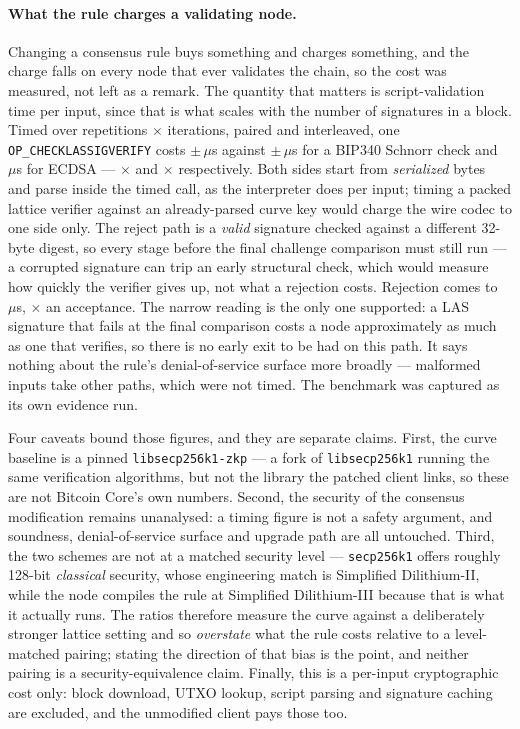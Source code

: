 \paragraph{What the rule charges a validating node.}
Changing a consensus rule buys something and charges something, and the charge falls on every
node that ever validates the chain, so the cost was measured, not left as a remark.
The quantity that matters is script-validation time per input, since that is what scales with
the number of signatures in a block. Timed over \btcLasBenchReps{} repetitions $\times$
\btcLasBenchIters{} iterations, paired and interleaved, one \texttt{OP\_CHECKLASSIGVERIFY}
costs \btcLasVerifyUs$\pm$\btcLasVerifySd\,$\mu$s against
\btcSchnorrVerifyUs$\pm$\btcSchnorrVerifySd\,$\mu$s for a BIP340 Schnorr check and
\btcEcdsaVerifyUs\,$\mu$s for ECDSA --- \btcLasRatioSchnorr$\times$ and
\btcLasRatioEcdsa$\times$ respectively. Both sides start from \emph{serialized} bytes and
parse inside the timed call, as the interpreter does per input; timing a packed lattice
verifier against an already-parsed curve key would charge the wire codec to one side only.
The reject path is a \emph{valid} signature checked against a different 32-byte digest, so
every stage before the final challenge comparison must still run --- a corrupted signature
can trip an early structural check, which would measure how quickly the verifier gives up, not what a rejection costs. Rejection comes to \btcLasRejectUs\,$\mu$s,
\btcLasRejectRatio$\times$ an acceptance. The narrow reading is the only one supported: a LAS
signature that fails at the final comparison costs a node approximately as much as one that
verifies, so there is no early exit to be had on this path. It says nothing about the rule's
denial-of-service surface more broadly --- malformed inputs take other paths, which were not
timed. The benchmark was captured as its own evidence run.

Four caveats bound those figures, and they are separate claims. First, the curve baseline is
a pinned \texttt{libsecp256k1-zkp} --- a fork of \texttt{libsecp256k1} running the same
verification algorithms, but not the library the patched client links, so these are not
Bitcoin Core's own numbers. Second, the security of the consensus modification remains
unanalysed: a timing figure is not a safety argument, and soundness, denial-of-service
surface and upgrade path are all untouched. Third, the two schemes are not at a matched
security level --- \texttt{secp256k1} offers roughly 128-bit \emph{classical} security, whose
engineering match is Simplified Dilithium-II, while the node compiles the rule at Simplified
Dilithium-III because that is what it actually runs. The ratios therefore measure the curve
against a deliberately stronger lattice setting and so \emph{overstate} what the rule costs
relative to a level-matched pairing; stating the direction of that bias is the point, and
neither pairing is a security-equivalence claim. Finally, this is a per-input cryptographic
cost only: block download, UTXO lookup, script parsing and signature caching are excluded,
and the unmodified client pays those too.
